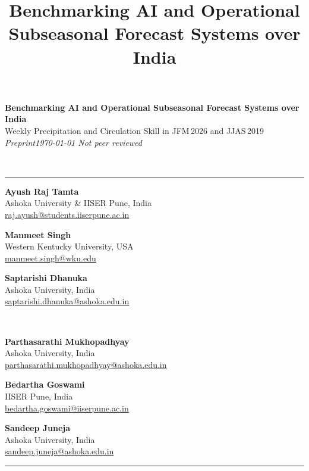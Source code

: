 \documentclass[11pt,a4paper]{article}
\title[Weekly Precipitation and Circulation Skill in JFM~2026 and JJAS~2019]%
      {Benchmarking AI and Operational Subseasonal Forecast Systems over India}
\date{}
\newcommand{\auth}[3]{%
  \parbox[t]{0.31\textwidth}{\centering
    {\sffamily\bfseries #1}\\[3pt]
    {\small #2}\\[2pt]
    {\footnotesize\url{#3}}}}
\newcommand{\printpreprint}[2]{%
  \noindent
  \colorbox{titleband}{%
    \parbox{\dimexpr\linewidth-2\fboxsep\relax}{%
      \vspace{9pt}
      \centering
      {\color{white}\sffamily\LARGE\bfseries #1}\\[6pt]
      {\color{accentrule!55!white}\sffamily\large #2}\\[8pt]
      {\color{white!60!titleband}\footnotesize\itshape
        Preprint\enspace\textbullet\enspace\today\enspace\textbullet\enspace
        Not peer reviewed}
      \vspace{8pt}}}%
  \\[-1pt]{\color{accentrule}\rule{\linewidth}{1.2pt}}%
  \vspace{8pt}
}
\begin{document}
\printpreprint
  {Benchmarking AI and Operational Subseasonal Forecast Systems over India}
  {Weekly Precipitation and Circulation Skill in JFM\,2026 and JJAS\,2019}

\begin{center}
  \auth{Ayush Raj Tamta}{Ashoka University \& IISER Pune, India}%
       {raj.ayush@students.iiserpune.ac.in}
  \hfill
  \auth{Manmeet Singh}{Western Kentucky University, USA}%
       {manmeet.singh@wku.edu}
  \hfill
  \auth{Saptarishi Dhanuka}{Ashoka University, India}%
       {saptarishi.dhanuka@ashoka.edu.in}
  \\[1.2em]
  \auth{Parthasarathi Mukhopadhyay}{Ashoka University, India}%
       {parthasarathi.mukhopadhyay@ashoka.edu.in}
  \hfill
  \auth{Bedartha Goswami}{IISER Pune, India}%
       {bedartha.goswami@iiserpune.ac.in}
  \hfill
  \auth{Sandeep Juneja}{Ashoka University, India}%
       {sandeep.juneja@ashoka.edu.in}
\end{center}

\vspace{10pt}
{\color{accentrule!40}\rule{\linewidth}{0.4pt}}
\vspace{6pt}
\end{document}
